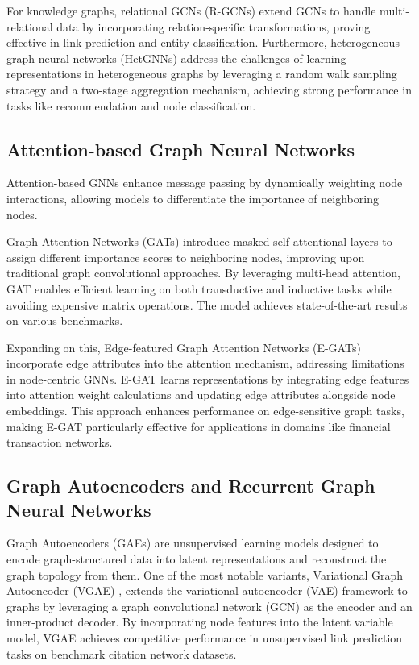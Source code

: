 \documentclass[journal]{IEEEtran}
\begin{document}
For knowledge graphs, relational GCNs (R-GCNs) \cite{schlichtkrull2018modeling} extend GCNs to handle multi-relational data by incorporating relation-specific transformations, proving effective in link prediction and entity classification. Furthermore, heterogeneous graph neural networks (HetGNNs) \cite{zhang2019heterogeneous} address the challenges of learning representations in heterogeneous graphs by leveraging a random walk sampling strategy and a two-stage aggregation mechanism, achieving strong performance in tasks like recommendation and node classification.



\subsection{Attention-based Graph Neural Networks}

Attention-based GNNs enhance message passing by dynamically weighting node interactions, allowing models to differentiate the importance of neighboring nodes. 

Graph Attention Networks (GATs) \cite{velivckovic2017graph} introduce masked self-attentional layers to assign different importance scores to neighboring nodes, improving upon traditional graph convolutional approaches. By leveraging multi-head attention, GAT enables efficient learning on both transductive and inductive tasks while avoiding expensive matrix operations. The model achieves state-of-the-art results on various benchmarks.

Expanding on this, Edge-featured Graph Attention Networks (E-GATs) \cite{wang2021egat, chen2021edge} incorporate edge attributes into the attention mechanism, addressing limitations in node-centric GNNs. E-GAT learns representations by integrating edge features into attention weight calculations and updating edge attributes alongside node embeddings. This approach enhances performance on edge-sensitive graph tasks, making E-GAT particularly effective for applications in domains like financial transaction networks.



\subsection{Graph Autoencoders and Recurrent Graph Neural Networks}

Graph Autoencoders (GAEs) are unsupervised learning models designed to encode graph-structured data into latent representations and reconstruct the graph topology from them. One of the most notable variants, Variational Graph Autoencoder (VGAE) \cite{kipf2016variational}, extends the variational autoencoder (VAE) framework to graphs by leveraging a graph convolutional network (GCN) as the encoder and an inner-product decoder. By incorporating node features into the latent variable model, VGAE achieves competitive performance in unsupervised link prediction tasks on benchmark citation network datasets.
\end{document}
